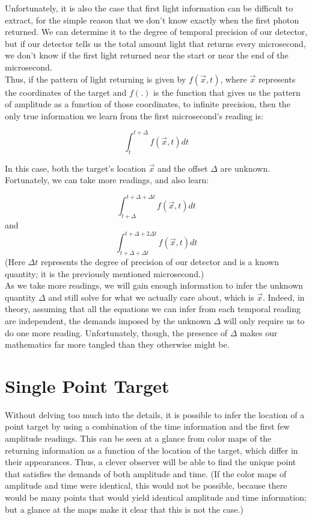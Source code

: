 \documentclass[11pt]{article}
\begin{document}
Unfortunately, it is also the case that first light information can be difficult to extract, for the simple reason that we don't know exactly when the first photon returned. We can determine it to the degree of temporal precision of our detector, but if our detector tells us the total amount light that returns every microsecond, we don't know if the first light returned near the start or near the end of the microsecond.  \\

Thus, if the pattern of light returning is given by $f(\vec{x}, t)$, where $\vec{x}$ represents the coordinates of the target and $f(.)$ is the function that gives us the pattern of amplitude as a function of those coordinates, to infinite precision, then the only true information we learn from the first microsecond's reading is: 

$$\int_t^{t+\Delta} f(\vec{x}, t) dt$$
 
In this case, both the target's location $\vec{x}$ and the offset $\Delta$ are unknown. Fortunately, we can take more readings, and also learn:

$$\int_{t+\Delta}^{t+\Delta + \Delta t} f(\vec{x}, t) dt$$
and
$$\int_{t+\Delta + \Delta t}^{t+\Delta + 2\Delta t} f(\vec{x}, t) dt$$
(Here $\Delta t$ represents the degree of precision of our detector and is a known quantity; it is the previously mentioned microsecond.) \\
 
As we take more readings, we will gain enough information to infer the unknown quantity $\Delta$ and still solve for what we actually care about, which is $\vec{x}$. Indeed, in theory, assuming that all the equations we can infer from each temporal reading are independent, the demands imposed by the unknown $\Delta$ will only require us to do one more reading. Unfortunately, though, the presence of $\Delta$ makes our mathematics far more tangled than they otherwise might be.

\section{Single Point Target}

Without delving too much into the details, it is possible to infer the location of a point target by using a combination of the time information and the first few amplitude readings. This can be seen at a glance from color maps of the returning information as a function of the location of the target, which differ in their appearances. Thus, a clever observer will be able to find the unique point that satisfies the demands of both amplitude and time. (If the color maps of amplitude and time were identical, this would not be possible, because there would be many points that would yield identical amplitude and time information; but a glance at the maps make it clear that this is not the case.) 
\end{document}
